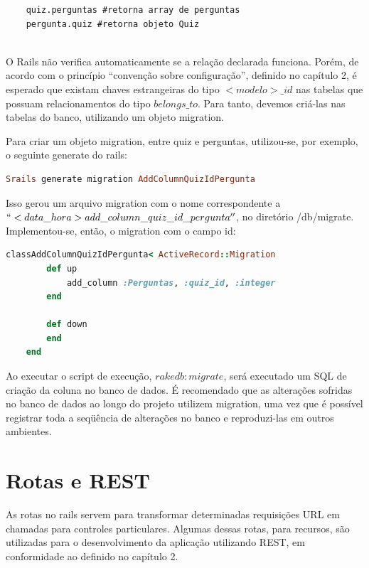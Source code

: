 \begin{lstlisting}   
	quiz.perguntas #retorna array de perguntas
	pergunta.quiz #retorna objeto Quiz
	
\end{lstlisting}     

    O Rails não verifica automaticamente se a relação declarada funciona. Porém, de acordo com o princípio ``convenção sobre configuração'', definido no capítulo 2, é esperado que existam chaves estrangeiras do tipo $<modelo>\_id$ nas tabelas que possuam relacionamentos do tipo $belongs\_to$. Para tanto, devemos criá-las nas tabelas do banco, utilizando um objeto migration.
	
            Para criar um objeto migration, entre quiz e perguntas, utilizou-se, por exemplo, o seguinte generate do rails:
\begin{lstlisting}[language=Ruby]			
    Srails generate migration AddColumnQuizIdPergunta
 \end{lstlisting}   
       
    Isso gerou um arquivo migration  com o nome correspondente a $``<data\_hora> add\_column\_quiz\_id\_pergunta''$, no diretório /db/migrate. Implementou-se, então, o migration com o campo id:
	
\begin{lstlisting}[language=Ruby]
    classAddColumnQuizIdPergunta< ActiveRecord::Migration
    	def up
    	    add_column :Perguntas, :quiz_id, :integer
    	end
     
    	def down
    	end
    end
 \end{lstlisting}    
 
    Ao executar o script de execução, $rake db:migrate$, será executado um SQL de criação da coluna no banco de dados. É recomendado que as alterações sofridas no banco de dados ao longo do projeto utilizem migration, uma vez que é possível registrar toda a seqüência de alterações no banco e reproduzi-las em outros ambientes.
     
     
    \section{Rotas e REST}
            As rotas no rails servem para transformar determinadas requisições \ac{URL} em chamadas para controles particulares.  Algumas dessas rotas, para recursos, são utilizadas para o desenvolvimento da aplicação utilizando \ac{REST}, em conformidade ao definido no capítulo 2.
			
